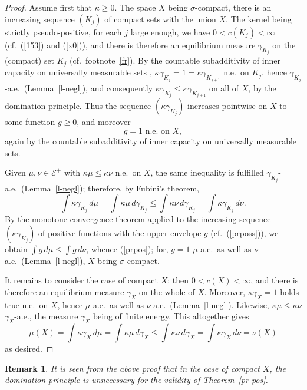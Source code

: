 \documentclass[12pt,a4paper,reqno]{amsart} %
\theoremstyle{lause}
\theoremstyle{maaritelma}
\theoremstyle{lause}
\theoremstyle{maaritelma}
\newtheorem{remark}[theorem]{Remark}
\numberwithin{equation}{section}
\begin{document}
\begin{proof}
Assume first that $\kappa\geqslant0$. The space $X$ being $\sigma$-compact, there is an increasing sequence $(K_j)$ of compact sets with the union $X$. The kernel being strictly pseu\-do-pos\-it\-ive, for each $j$ large enough, we have $0<c(K_j)<\infty$ (cf.\ (\ref{153}) and (\ref{x0})), and there is therefore an equilibrium measure $\gamma_{K_j}$ on the (compact) set $K_j$ (cf.\ footnote~\ref{fr}). By the countable subadditivity of inner capacity on universally measurable sets \cite[Lemma~2.3.5]{F1}, $\kappa\gamma_{K_j}=1=\kappa\gamma_{K_{j+1}}$ n.e.\ on $K_j$, hence $\gamma_{K_j}$-a.e.\ (Lemma~\ref{l-negl}), and consequently $\kappa\gamma_{K_j}\leqslant\kappa\gamma_{K_{j+1}}$ on all of $X$, by the domination principle.
Thus the sequence $(\kappa\gamma_{K_j})$ increases pointwise on $X$ to some function $g\geqslant0$, and moreover
\begin{equation}\label{prposs}g=1\text{ \ n.e.\ on $X$},\end{equation}
again by the countable subadditivity of inner capacity on universally measurable sets.

Given $\mu,\nu\in\mathcal E^+$ with $\kappa\mu\leqslant\kappa\nu$ n.e.\ on $X$, the same inequality is fulfilled $\gamma_{K_j}$-a.e.\ (Lemma~\ref{l-negl}); therefore, by Fubini's theorem,
\[\int\kappa\gamma_{K_j}\,d\mu=\int\kappa\mu\,d\gamma_{K_j}\leqslant
\int\kappa\nu\,d\gamma_{K_j}=\int\kappa\gamma_{K_j}\,d\nu.\]
By the monotone convergence theorem %
applied to the increasing sequence $(\kappa\gamma_{K_j})$ of positive functions with the upper envelope $g$ (cf.\ (\ref{prposs})), we obtain $\int g\,d\mu\leqslant\int g\,d\nu$,
whence (\ref{prpos}); for, $g=1$ $\mu$-a.e.\ as well as $\nu$-a.e.\ (Lemma~\ref{l-negl}), $X$ being $\sigma$-compact.

It remains to consider the case of compact $X$; then $0<c(X)<\infty$, and there is therefore an equilibrium measure $\gamma_X$ on the whole of $X$. Moreover, $\kappa\gamma_X=1$ holds true n.e.\ on $X$, hence $\mu$-a.e.\ as well as $\nu$-a.e.\ (Lemma~\ref{l-negl}). Likewise, $\kappa\mu\leqslant\kappa\nu$ $\gamma_X$-a.e., the measure $\gamma_X$ being of finite energy. This altogether gives
\[\mu(X)=\int\kappa\gamma_X\,d\mu=\int\kappa\mu\,d\gamma_X\leqslant\int\kappa\nu\,d\gamma_X=
\int\kappa\gamma_X\,d\nu=\nu(X)\]
as desired.
\end{proof}

\begin{remark}It is seen from the above proof that in the case of compact $X$, the domination principle is unnecessary for the validity of Theorem~\ref{pr-pos}.\label{prposm}\end{remark}
\end{document}
